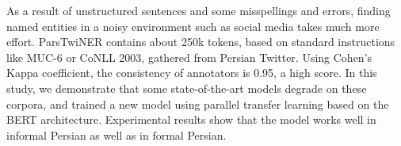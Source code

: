 As a result of unstructured sentences and some misspellings and errors, finding named entities in a noisy environment such as social media takes much more effort. ParsTwiNER contains about 250k tokens, based on standard instructions like MUC-6 or CoNLL 2003, gathered from Persian Twitter. Using Cohen's Kappa coefficient, the consistency of annotators is 0.95, a high score. In this study, we demonstrate that some state-of-the-art models degrade on these corpora, and trained a new model using parallel transfer learning based on the BERT architecture. Experimental results show that the model works well in informal Persian as well as in formal Persian.
